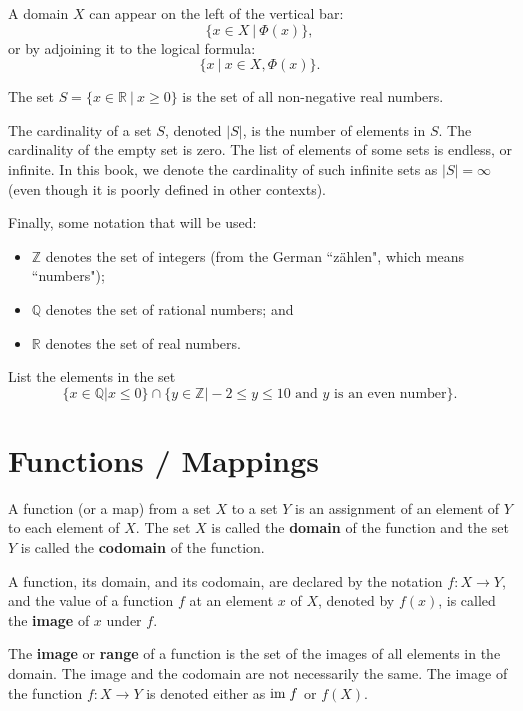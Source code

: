 A domain $X$ can appear on the left of the vertical bar:
\[
    \{x \in X \ | \ \Phi(x)\},
\]
or by adjoining it to the logical formula:
\[
    \{x \ | \ x \in X, \Phi(x)\}.
\]
\begin{example}
    The set $S = \{x \in \mathbb{R} \ | \ x \geq 0 \}$ is the set of all non-negative real numbers.
\end{example}

The cardinality of a set $S$, denoted $|S|$, is the number of elements in $S$. The cardinality of the empty set is zero. The list of elements of some sets is endless, or infinite. In this book, we denote the cardinality of such infinite sets as $|S| = \infty$ (even though it is poorly defined in other contexts).

Finally, some notation that will be used:
\begin{itemize}
    \item $\mathbb{Z}$ denotes the set of integers (from the German ``z\"ahlen", which means ``numbers");
    \item $\mathbb{Q}$ denotes the set of rational numbers; and
    \item $\mathbb{R}$ denotes the set of real numbers.
\end{itemize}

\begin{exercise}
    List the elements in the set
    \[
        \{x \in \mathbb{Q} \vert x \leq 0\} \cap \{y \in \mathbb{Z} \vert -2 \leq y \leq 10 \text{ and } y \text{ is an even number} \}.
    \]
\end{exercise}

\chapter{Functions / Mappings}
A function (or a map) from a set $X$ to a set $Y$ is an assignment of an element of $Y$ to each element of $X$. The set $X$ is called the \textbf{domain} of the function and the set $Y$ is called the \textbf{codomain} of the function.

A function, its domain, and its codomain, are declared by the notation $f: X\to Y$, and the value of a function $f$ at an element $x$ of $X$, denoted by $f(x)$, is called the \textbf{image} of $x$ under $f$.

The \textbf{image} or \textbf{range} of a function is the set of the images of all elements in the domain. The image and the codomain are not necessarily the same. The image of the function $f: X \to Y$ is denoted either as $\mathrm{im}\; f$ or $f(X)$.

